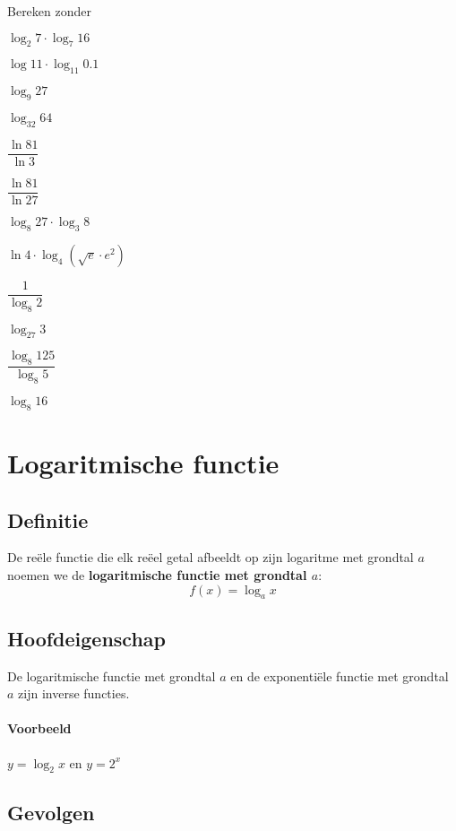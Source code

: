 \documentclass[12pt,twoside]{article}
\begin{document}
\begin{oefening} %
Bereken zonder 
\begin{exlist}{3}
  \item $\log_2 7 \cdot \log_7 16$
  \item $\log 11 \cdot \log_{11} 0.1$
  \item $\log_9 27$
  \item $\log_{32} 64$
  \item $\dfrac{\ln 81}{\ln 3}$
  \item $\dfrac{\ln 81}{\ln 27}$
  \item $\log_8 27 \cdot \log_3 8$
  \item $\ln 4 \cdot \log_4 (\sqrt{e}\cdot e^2)$
  \item $\dfrac{1}{\log_8 2}$
  \item $\log_27 3$
  \item $\dfrac{\log_8 125}{\log_8 5}$
  \item $\log_8 16$
\end{exlist}
\end{oefening}

\pagebreak
\section{Logaritmische functie}

\subsection{Definitie}
De reële functie die elk reëel getal afbeeldt op zijn logaritme met grondtal $a$ noemen we de {\bf logaritmische functie met grondtal $a$}:
$$f(x) = \log_a x$$

\subsection{Hoofdeigenschap}

\begin{mdframed}
De logaritmische functie met grondtal $a$ en de exponentiële functie met grondtal $a$ zijn inverse functies.
\end{mdframed}

\paragraph{Voorbeeld} $y=\log_2 x$ en $y=2^x$

\subsection{Gevolgen}
\end{document}
